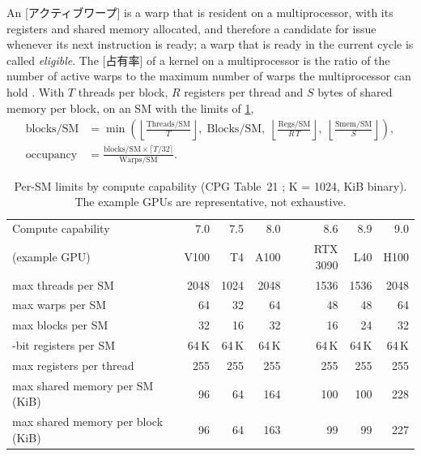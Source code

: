\documentclass[../main.tex]{subfiles}
\begin{document}
\begin{definition}
  An [アクティブワープ] is a warp that is resident on
  a multiprocessor, with its registers and shared memory allocated, and
  therefore a candidate for issue whenever its next instruction is ready;
  a warp that is ready in the current cycle is called \emph{eligible}.  The
  [占有率] of a kernel on a multiprocessor is the ratio of
  the number of active warps to the maximum number of warps the
  multiprocessor can hold \cite[§11.1]{nvidia2026cudabestpractices}.
  With $T$ threads per block, $R$ registers per thread and $S$ bytes of
  shared memory per block, on an SM with the limits of
  \cref{tab:l03-cc-limits},
  \begin{align}
    \text{blocks/SM} &= \min\!\left(
      \left\lfloor \frac{\text{Threads/SM}}{T} \right\rfloor,\;
      \text{Blocks/SM},\;
      \left\lfloor \frac{\text{Regs/SM}}{R\,T} \right\rfloor,\;
      \left\lfloor \frac{\text{Smem/SM}}{S} \right\rfloor \right),
    \label{eq:l03-blocks}\\
    \text{occupancy} &= \frac{\text{blocks/SM} \times \lceil T/32 \rceil}
                             {\text{Warps/SM}}.
    \label{eq:l03-occupancy}
  \end{align}
\end{definition}

\begin{table}[tb]
  \centering
  \small
  \setlength{\tabcolsep}{4pt}
  \caption{Per-SM limits by compute capability (CPG Table~21
    \cite{nvidia2024cudaguide}; K = 1024, KiB binary).  The example GPUs
    are representative, not exhaustive.}
  \label{tab:l03-cc-limits}
  \begin{tabular}{>{\raggedright\arraybackslash}p{33mm}rrrrrr}
    \toprule
    Compute capability & 7.0 & 7.5 & 8.0 & 8.6 & 8.9 & 9.0 \\
    (example GPU) & V100 & T4 & A100 & RTX 3090 & L40 & H100 \\
    \midrule
    max threads per SM & 2048 & 1024 & 2048 & 1536 & 1536 & 2048 \\
    max warps per SM & 64 & 32 & 64 & 48 & 48 & 64 \\
    max blocks per SM & 32 & 16 & 32 & 16 & 24 & 32 \\
    32-bit registers per SM & 64\,K & 64\,K & 64\,K & 64\,K & 64\,K & 64\,K \\
    max registers per thread & 255 & 255 & 255 & 255 & 255 & 255 \\
    max shared memory per SM (KiB) & 96 & 64 & 164 & 100 & 100 & 228 \\
    max shared memory per block (KiB) & 96 & 64 & 163 & 99 & 99 & 227 \\
    \bottomrule
  \end{tabular}
\end{table}
\end{document}

